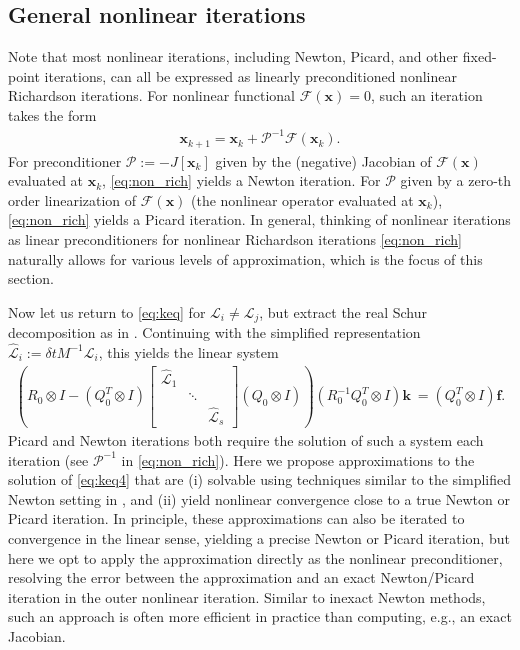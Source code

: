 \documentclass[review]{siamart}
\begin{document}
\subsection{General nonlinear iterations}\label{sec:nonlinear:gen}

Note that most nonlinear iterations, including Newton, Picard, and
other fixed-point iterations, can all be expressed as linearly preconditioned
nonlinear Richardson iterations. For nonlinear functional
$\mathcal{F}(\mathbf{x}) = 0$, such an iteration takes the form
%
\begin{align}\label{eq:non_rich}
\mathbf{x}_{k+1} = \mathbf{x}_k + \mathcal{P}^{-1}\mathcal{F}(\mathbf{x}_k).
\end{align}
%
For preconditioner $\mathcal{P} := -J[\mathbf{x}_k]$ given by the (negative)
Jacobian of $\mathcal{F}(\mathbf{x})$ evaluated at $\mathbf{x}_k$, \eqref{eq:non_rich}
yields a Newton iteration. For $\mathcal{P}$ given by a zero-th order linearization
of $\mathcal{F}(\mathbf{x})$ (the nonlinear operator evaluated at $\mathbf{x}_k$),
\eqref{eq:non_rich} yields a Picard iteration. In general, thinking of nonlinear
iterations as linear preconditioners for nonlinear Richardson iterations
\eqref{eq:non_rich} naturally allows for various levels of approximation,
which is the focus of this section.

Now let us return to \eqref{eq:keq} for $\mathcal{L}_i\neq\mathcal{L}_j$, but
extract the real Schur decomposition as in . Continuing
with the simplified representation $\widehat{\mathcal{L}}_i := \delta t M^{-1}\mathcal{L}_i$,
this yields the linear system
%
\begin{align}\label{eq:keq4}
\left( R_0\otimes I - (Q_0^T\otimes I) \begin{bmatrix}
	\widehat{\mathcal{L}}_1  & \\ & \ddots \\ && \widehat{\mathcal{L}}_s\end{bmatrix}
	(Q_0\otimes I)\right) (R_0^{-1}Q_0^T\otimes I) \mathbf{k}\
= (Q_0^T\otimes I)\mathbf{f}.
\end{align}
%
Picard and Newton iterations both require the solution of such a system each
iteration (see $\mathcal{P}^{-1}$ in \eqref{eq:non_rich}). Here we propose
approximations to the solution of \eqref{eq:keq4} that are (i) solvable using
techniques similar to the simplified Newton setting in
, and (ii) yield nonlinear convergence close to a true
Newton or Picard iteration. In principle, these approximations can also be
iterated to convergence in the linear sense, yielding a precise Newton or Picard
iteration, but here we opt to apply the approximation directly as the nonlinear
preconditioner, resolving the error between the approximation and an exact
Newton/Picard iteration in the outer nonlinear iteration. Similar to inexact
Newton methods, such an approach is often more efficient in practice than
computing, e.g., an exact Jacobian.
\end{document}
